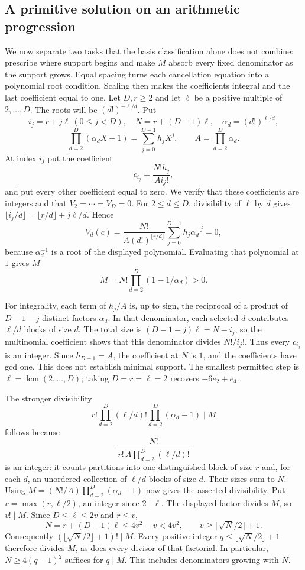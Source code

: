 \subsection{A primitive solution on an arithmetic progression}\label{long68:sec:progression}
We now separate two tasks that the basis classification alone does
not combine: prescribe where support begins and make $M$ absorb every
fixed denominator as the support grows. Equal spacing turns each
cancellation equation into a polynomial root condition. Scaling then
makes the coefficients integral and the last coefficient equal to one.
Let $D,r\ge2$ and let $\ell$ be a positive multiple of $2,\ldots,D$.
The roots will be $(d!)^{-\ell/d}$. Put
\[
i_j=r+j\ell\ (0\le j<D),\quad N=r+(D-1)\ell,\quad
\alpha_d=(d!)^{\ell/d},
\]
\[
\prod_{d=2}^D(\alpha_dX-1)=\sum_{j=0}^{D-1}h_jX^j,
\qquad A=\prod_{d=2}^D\alpha_d.
\]
At index $i_j$ put the coefficient
\[
c_{i_j}=\frac{N!h_j}{A i_j!},
\]
and put every other coefficient equal to zero. We verify that these
coefficients are integers and that $V_2=\cdots=V_D=0$.
For $2\le d\le D$, divisibility of $\ell$ by $d$ gives
$\lfloor i_j/d\rfloor=\lfloor r/d\rfloor+j\ell/d$. Hence
\[
V_d(c)=
\frac{N!}{A(d!)^{\lfloor r/d\rfloor}}
\sum_{j=0}^{D-1}h_j\alpha_d^{-j}=0,
\]
because $\alpha_d^{-1}$ is a root of the displayed polynomial. Evaluating
that polynomial at $1$ gives $M$
\[
M=N!\prod_{d=2}^D(1-1/\alpha_d)>0.
\]

For integrality, each term of $h_j/A$ is, up to sign, the reciprocal of
a product of $D-1-j$ distinct factors $\alpha_d$. In that denominator,
each selected $d$ contributes $\ell/d$ blocks of size $d$. The total size is
$(D-1-j)\ell=N-i_j$, so the multinomial coefficient shows that this
denominator divides $N!/i_j!$. Thus every $c_{i_j}$ is an integer.
Since $h_{D-1}=A$, the coefficient at $N$ is $1$, and the coefficients
have gcd one. This does not establish minimal support. The smallest
permitted step is $\ell=\operatorname{lcm}(2,\ldots,D)$; taking $D=r=\ell=2$
recovers $-6e_2+e_4$.

The stronger divisibility
\[
r!\prod_{d=2}^D(\ell/d)!\prod_{d=2}^D(\alpha_d-1)\mid M
\]
follows because
\[
\frac{N!}{r!\,A\prod_{d=2}^D(\ell/d)!}
\]
is an integer: it counts partitions into one distinguished block of size
$r$ and, for each $d$, an unordered collection of $\ell/d$ blocks of size
$d$. Their sizes sum to $N$. Using
$M=(N!/A)\prod_{d=2}^D(\alpha_d-1)$ now gives the asserted divisibility.
Put $v=\max(r,\ell/2)$, an integer since $2\mid\ell$. The displayed
factor divides $M$, so $v!\mid M$. Since $D\le\ell\le2v$ and $r\le v$,
\[
 N=r+(D-1)\ell\le4v^2-v<4v^2,
 \qquad v\ge\lfloor\sqrt N/2\rfloor+1.
\]
Consequently $(\lfloor\sqrt N/2\rfloor+1)!\mid M$. Every positive integer
$q\le\lfloor\sqrt N/2\rfloor+1$ therefore divides $M$, as does every
divisor of that factorial. In particular, $N\ge4(q-1)^2$ suffices for
$q\mid M$. This includes denominators growing with $N$.

